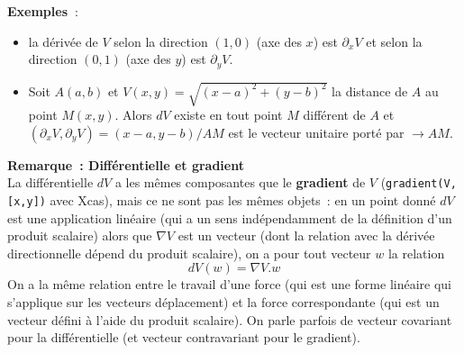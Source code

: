 \documentclass[a4paper,11pt]{book}
\begin{document}
\begin{giacjshere}
{\bf Exemples~}: 
\begin{itemize}
\item la d\'eriv\'ee de $V$ selon la direction $(1,0)$ (axe des $x$)
est $\partial_xV$ et selon la direction $(0,1)$ (axe des $y$)
est $\partial_y V$.
\item Soit $A(a,b)$ et $V(x,y)=\sqrt{(x-a)^2+(y-b)^2}$ 
la distance de $A$ au point $M(x,y)$.
Alors $dV$ existe en tout point $M$ diff\'erent de $A$
et $(\partial_x V,\partial_y V)=(x-a,y-b)/AM$ est le vecteur
unitaire port\'e par $\rightarrow{AM}$.
\end{itemize}

{\bf Remarque~: Diff\'erentielle et gradient}\\
La diff\'erentielle $dV$ a les m\^emes composantes que
le {\bf gradient} de $V$ (\verb|gradient(V,[x,y])| avec Xcas), 
mais ce ne sont pas les m\^emes objets~: 
en un point donn\'e
$dV$ est une application lin\'eaire (qui a un sens ind\'ependamment
de la d\'efinition d'un produit scalaire)
alors que $\nabla V$ est un vecteur (dont la relation
avec la d\'eriv\'ee directionnelle d\'epend du produit scalaire), 
on a pour tout vecteur $w$ la relation 
$$dV(w)=\nabla V. w $$
On a la m\^eme relation entre le travail d'une force (qui est une
forme lin\'eaire qui s'applique sur les vecteurs d\'eplacement) 
et la force correspondante (qui est un vecteur
d\'efini \`a l'aide du produit scalaire). On parle parfois de vecteur
covariant pour la diff\'erentielle (et vecteur contravariant pour le
gradient).


\end{giacjshere}
\end{document}
